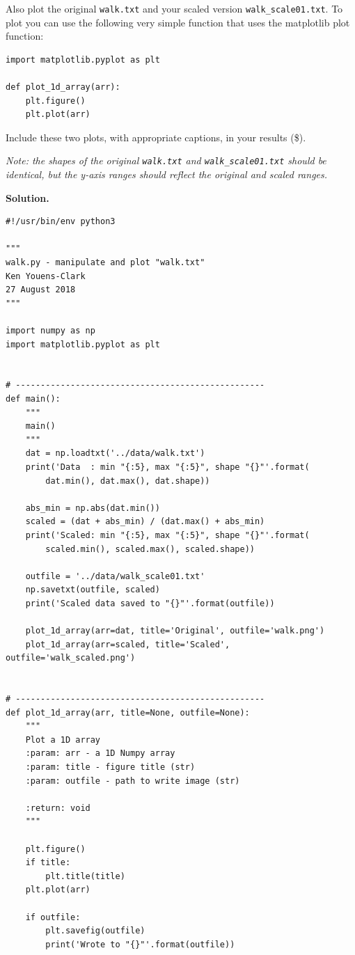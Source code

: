 \documentclass[10pt]{article}
\begin{document}
\begin{enumerate}
Also plot the original {\tt walk.txt} and your scaled version {\tt walk\_scale01.txt}.  To plot you can use the following very simple function that uses the matplotlib plot function:
\begin{verbatim}
import matplotlib.pyplot as plt

def plot_1d_array(arr):
    plt.figure()
    plt.plot(arr)
\end{verbatim}
Include these two plots, with appropriate captions, in your results (\$).

{\em Note: the shapes of the original {\tt walk.txt} and {\tt walk\_scale01.txt} should be identical, but the y-axis ranges should reflect the original and scaled ranges.}

{\bf Solution.} 

\begin{verbatim}
#!/usr/bin/env python3

"""
walk.py - manipulate and plot "walk.txt"
Ken Youens-Clark
27 August 2018
"""

import numpy as np
import matplotlib.pyplot as plt


# --------------------------------------------------
def main():
    """
    main()
    """
    dat = np.loadtxt('../data/walk.txt')
    print('Data  : min "{:5}, max "{:5}", shape "{}"'.format(
        dat.min(), dat.max(), dat.shape))

    abs_min = np.abs(dat.min())
    scaled = (dat + abs_min) / (dat.max() + abs_min)
    print('Scaled: min "{:5}, max "{:5}", shape "{}"'.format(
        scaled.min(), scaled.max(), scaled.shape))

    outfile = '../data/walk_scale01.txt'
    np.savetxt(outfile, scaled)
    print('Scaled data saved to "{}"'.format(outfile))

    plot_1d_array(arr=dat, title='Original', outfile='walk.png')
    plot_1d_array(arr=scaled, title='Scaled', outfile='walk_scaled.png')


# --------------------------------------------------
def plot_1d_array(arr, title=None, outfile=None):
    """
    Plot a 1D array
    :param: arr - a 1D Numpy array
    :param: title - figure title (str)
    :param: outfile - path to write image (str)

    :return: void
    """

    plt.figure()
    if title:
        plt.title(title)
    plt.plot(arr)

    if outfile:
        plt.savefig(outfile)
        print('Wrote to "{}"'.format(outfile))


\end{verbatim}
\end{enumerate}
\end{document}
